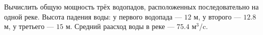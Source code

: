 Вычислить общую мощность трёх водопадов, расположенных последовательно 
на одной реке. Высота падения воды: у первого водопада --- $12$ м, у 
второго --- $12.8$ м, у третьего --- $15$ м. Средний раасход воды в реке
 --- $75.4$ м$^3$/c.
